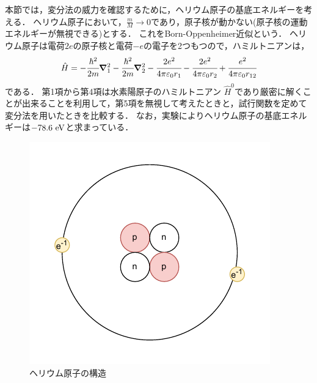 \documentclass{report}
\begin{document}
  本節では，変分法の威力を確認するために，ヘリウム原子の基底エネルギーを考える．
  ヘリウム原子において，$\frac{m}{M}\to 0$であり，原子核が動かない(原子核の運動エネルギーが無視できる)とする．
  これをBorn-Oppenheimer近似という．
  ヘリウム原子は電荷$2e$の原子核と電荷$-e$の電子を2つもつので，ハミルトニアンは，
    \begin{align}
      \hat{H} = -\cfrac{\hbar^2}{2m}\grad_{1}^{2} -\cfrac{\hbar^2}{2m}\grad_{2}^{2} - \cfrac{2e^2}{4\pi \varepsilon_0 r_1} - \cfrac{2e^2}{4\pi \varepsilon_0 r_2} + \cfrac{e^2}{4\pi \varepsilon_0 r_{12}}
    \end{align}
    である．
    第1項から第4項は水素陽原子のハミルトニアン $\hat{H}^0$であり厳密に解くことが出来ることを利用して，第5項を無視して考えたときと，試行関数を定めて変分法を用いたときを比較する．
    なお，実験によりヘリウム原子の基底エネルギーは$-78.6\ \mathrm{eV}$と求まっている．

    \begin{figure}[htbp]
      \centering
      \includegraphics[width=0.5\columnwidth]{fig/helium.pdf}
      \caption{ヘリウム原子の構造}
      \label{helium-atom}
    \end{figure}
    
\end{document}
